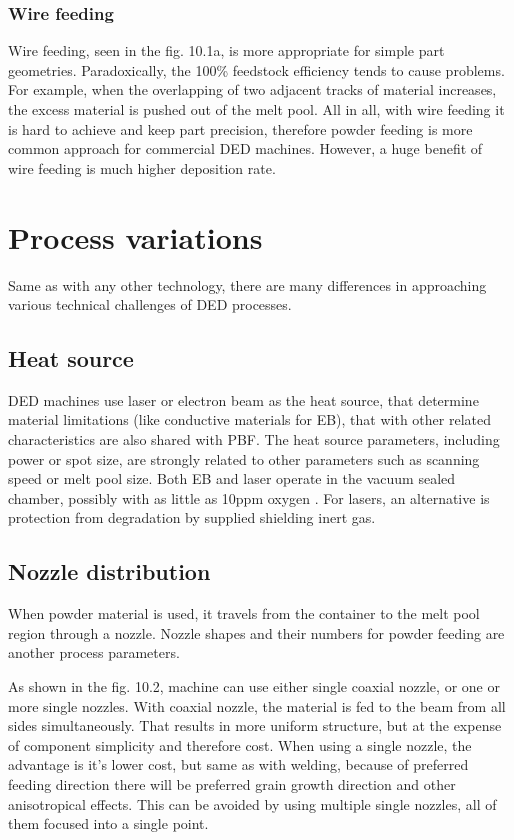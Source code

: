 \documentclass[a4paper, 11pt, reqno]{report}
\begin{document}
\subsubsection{Wire feeding}
Wire feeding, seen in the fig. 10.1a, is more appropriate for simple part geometries. Paradoxically, the 100\% feedstock efficiency tends to cause problems. For example, when the overlapping of two adjacent tracks of material increases, the excess material is pushed out of the melt pool. All in all, with wire feeding it is hard to achieve and keep part precision, therefore powder feeding is more common approach for commercial DED machines. However, a huge benefit of wire feeding is much higher deposition rate.

\section{Process variations}
Same as with any other technology, there are many differences in approaching various technical challenges of DED processes.


\subsection{Heat source}
DED machines use laser or electron beam as the heat source, that determine material limitations (like conductive materials for EB), that with other related characteristics are also shared with PBF. The heat source parameters, including power or spot size, are strongly related to other parameters such as scanning speed or melt pool size. Both EB and laser operate in the vacuum sealed chamber, possibly with as little as 10ppm oxygen \cite[p. 252]{AMT}. For lasers, an alternative is protection from degradation by supplied shielding inert gas. 
\subsection{Nozzle distribution}
When powder material is used, it travels from the container to the melt pool region through a nozzle. Nozzle shapes and their numbers for powder feeding are another process parameters.
	
	As shown in the fig. 10.2, machine can use either single coaxial nozzle, or one or more single nozzles. With coaxial nozzle, the material is fed to the beam from all sides simultaneously. That results in more uniform structure, but at the expense of component simplicity and therefore cost. When using a single nozzle, the advantage is it's lower cost, but same as with welding, because of preferred feeding direction there will be preferred grain growth direction and other anisotropical effects. This can be avoided by using multiple single nozzles, all of them focused into a single point.
\end{document}
